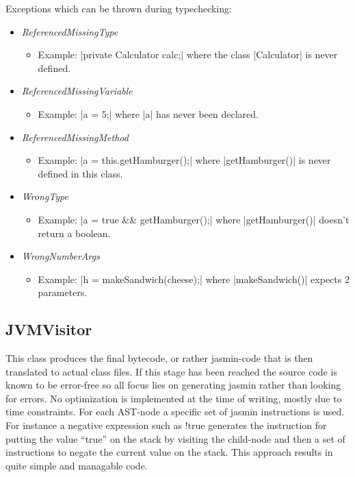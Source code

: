 \documentclass[paper=a4, fontsize=11pt]{scrartcl} %
\numberwithin{equation}{section} %
\numberwithin{figure}{section} %
\numberwithin{table}{section} %
\begin{document}
Exceptions which can be thrown during typechecking:
\begin{itemize}
  \item{\emph{ReferencedMissingType}}
  \begin{itemize}
    \item{Example: |private Calculator calc;| where the class |Calculator| is never defined.}
  \end{itemize}
  \item{\emph{ReferencedMissingVariable}}
  \begin{itemize}
    \item{Example: |a = 5;| where |a| has never been declared.}
  \end{itemize}
  \item{\emph{ReferencedMissingMethod}}
  \begin{itemize}
    \item{Example: |a = this.getHamburger();| where |getHamburger()| is never defined in this class.}
  \end{itemize}
  \item{\emph{WrongType}}
  \begin{itemize}
    \item{Example: |a = true && getHamburger();| where |getHamburger()| doesn’t return a boolean.}
  \end{itemize}
  \item{\emph{WrongNumberArgs}}
  \begin{itemize}
    \item{Example: |h = makeSandwich(cheese);| where |makeSandwich()| expects 2 parameters. }
  \end{itemize}
\end{itemize}

\subsection{JVMVisitor}
This class produces the final bytecode, or rather jasmin-code that is then translated to actual class files. If this stage has been reached the source code is known to be error-free so all focus lies on generating jasmin rather than looking for errors. No optimization is implemented at the time of writing, mostly due to time constraints. For each AST-node a specific set of jasmin instructions is used. For instance a negative expression such as !true generates the instruction for putting the value “true” on the stack by visiting the child-node and then a set of instructions to negate the current value on the stack. This approach results in quite simple and managable code.\\
\end{document}
